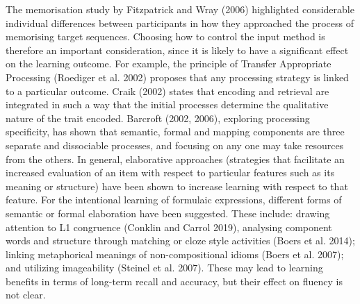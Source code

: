 \documentclass[12pt]{article}
\newenvironment{styleStandard}{\setlength\leftskip{0cm}\setlength\rightskip{0cm plus 1fil}\setlength\parindent{0cm}\setlength\parfillskip{0pt plus 1fil}\setlength\parskip{0in plus 1pt}\writerlistparindent\writerlistleftskip\leavevmode\normalfont\normalsize\writerlistlabel\ignorespaces}{\unskip\vspace{0.111in plus 0.0111in}\par}
\newcommand\writerlistleftskip{}
\newcommand\writerlistparindent{}
\newcommand\writerlistlabel{}
\begin{document}
\begin{styleStandard}
The memorisation study by Fitzpatrick and Wray (2006) highlighted considerable individual differences between participants in how they approached the process of memorising target sequences. Choosing how to control the input method is therefore an important consideration, since it is likely to have a significant effect on the learning outcome. For example, the principle of Transfer Appropriate Processing (Roediger et al. 2002) proposes that any processing strategy is linked to a particular outcome. Craik (2002) states that encoding and retrieval are integrated in such a way that the initial processes determine the qualitative nature of the trait encoded. Barcroft (2002, 2006), exploring processing specificity, has shown that semantic, formal and mapping components are three separate and dissociable processes, and focusing on any one may take resources from the others. In general, elaborative approaches (strategies that facilitate an increased evaluation of an item with respect to particular features such as its meaning or structure) have been shown to increase learning with respect to that feature. For the intentional learning of formulaic expressions, different forms of semantic or formal elaboration have been suggested. These include: drawing attention to L1 congruence (Conklin and Carrol 2019), analysing component words and structure through matching or cloze style activities (Boers et al. 2014); linking metaphorical meanings of non-compositional idioms (Boers et al. 2007); and utilizing imageability (Steinel et al. 2007). These may lead to learning benefits in terms of long-term recall and accuracy, but their effect on fluency is not clear.
\end{styleStandard}
\end{document}
